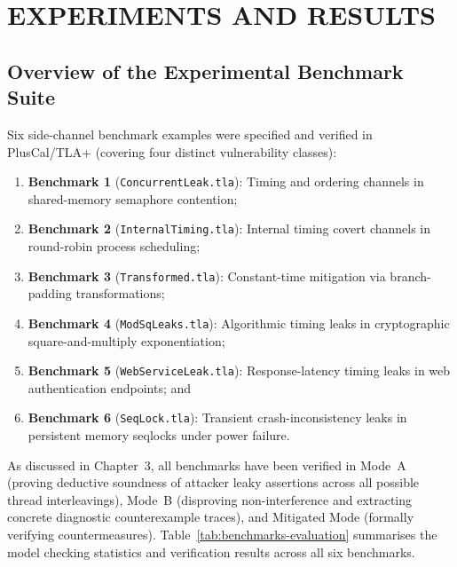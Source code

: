 \documentclass[a4paper,12pt]{report}
\begin{document}
\chapter{EXPERIMENTS AND RESULTS}

\section{Overview of the Experimental Benchmark Suite}
Six side-channel benchmark examples were specified and verified in PlusCal/TLA+ (covering four distinct vulnerability classes):
\begin{enumerate}[label=(\arabic*), itemsep=0.15em, topsep=0.12em]
    \item \textbf{Benchmark 1} (\texttt{ConcurrentLeak.tla}): Timing and ordering channels in shared-memory semaphore contention;
    \item \textbf{Benchmark 2} (\texttt{InternalTiming.tla}): Internal timing covert channels in round-robin process scheduling;
    \item \textbf{Benchmark 3} (\texttt{Transformed.tla}): Constant-time mitigation via branch-padding transformations;
    \item \textbf{Benchmark 4} (\texttt{ModSqLeaks.tla}): Algorithmic timing leaks in cryptographic square-and-multiply exponentiation;
    \item \textbf{Benchmark 5} (\texttt{WebServiceLeak.tla}): Response-latency timing leaks in web authentication endpoints; and
    \item \textbf{Benchmark 6} (\texttt{SeqLock.tla}): Transient crash-inconsistency leaks in persistent memory seqlocks under power failure.
\end{enumerate}

As discussed in Chapter~3, all benchmarks have been verified in Mode~A (proving deductive soundness of attacker leaky assertions across all possible thread interleavings), Mode~B (disproving non-interference and extracting concrete diagnostic counterexample traces), and Mitigated Mode (formally verifying countermeasures). Table~\ref{tab:benchmarks-evaluation} summarises the model checking statistics and verification results across all six benchmarks.
\end{document}
